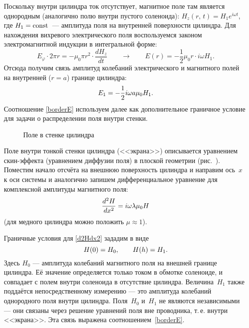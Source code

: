 Поскольку внутри цилиндра ток отсутствует, магнитное поле там является 
однородным (аналогично полю внутри пустого соленоида): 
$H_z(r,\,t)=H_1 e^{i\omega t}$, где $H_1=\mathrm{const}$~--- амплитуда поля на внутренней
поверхности цилиндра. Для нахождения вихревого электрического поля 
воспользуемся законом электромагнитной индукции  в интегральной
форме:
\[
E_{\varphi}\cdot 2\pi r = -\mu_0 \pi r^2 \cdot \frac{dH_z}{dt}\qquad
\to 
\qquad 
E(r) = -\frac12 \mu_0 r \cdot i\omega H_1.
\]
Отсюда получим связь амплитуд колебаний электрического и магнитного полей 
на внутренней ($r=a$) границе цилиндра:
\begin{equation}\eqmark{borderE}
E_1 = -\frac12  i\omega a\mu_0 H_1.
\end{equation}
Соотношение \eqref{borderE} используем далее как дополнительное граничное
условие для задачи о распределении поля внутри стенки.

\begin{wrapfigure}{o}{0.27\textwidth}
    \caption{Поле в стенке цилиндра}
\end{wrapfigure}
Поле внутри тонкой стенки цилиндра (<<экрана>>) описывается уравнением скин-эффекта
 (уравнением диффузии поля) в плоской геометрии 
(рис.~).
Поместим начало отсчёта на внешнюю поверхность цилиндра и направим ось~$x$ 
к оси системы и аналогично 
запишем дифференциальное уравнение для комплексной амплитуды магнитного поля:
\begin{equation}\eqmark{d2Hdx2}
\frac{d^2H}{dx^2} = i\omega \lambda \mu_0 H
\end{equation}
(для медного цилиндра можно положить $\mu\approx 1$).

Граничные условия для \eqref{d2Hdx2} зададим в виде
\begin{equation}\eqmark{borderH}
H(0) = H_0,\qquad H(h) = H_1.
\end{equation}
Здесь $H_0$ --- амплитуда колебаний магнитного поля на внешней
границе цилиндра. Её значение определяется только током 
в обмотке соленоиде, и совпадает с полем внутри соленоида 
в отсутствие цилиндра. Величина~$H_1$ также поддаётся непосредственному 
измерению --- это амплитуда колебаний однородного поля внутри цилиндра.
Поля~$H_0$ и~$H_1$ не являются независимыми --- они связаны через 
решение уравнений поля вне проводника, т.\,е. внутри <<экрана>>. Эта связь
выражена соотношением~\eqref{borderE}.


